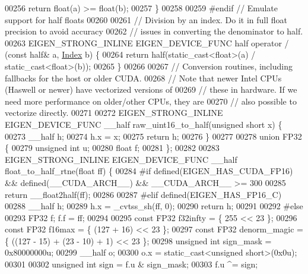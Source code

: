 \begin{DoxyCode}
00256   \textcolor{keywordflow}{return} float(a) >= float(b);
00257 \}
00258 
00259 \textcolor{preprocessor}{#endif  // Emulate support for half floats}
00260 
00261 \textcolor{comment}{// Division by an index. Do it in full float precision to avoid accuracy}
00262 \textcolor{comment}{// issues in converting the denominator to half.}
00263 EIGEN\_STRONG\_INLINE EIGEN\_DEVICE\_FUNC half operator / (\textcolor{keyword}{const} half& a, \hyperlink{namespace_eigen_a62e77e0933482dafde8fe197d9a2cfde}{Index} b) \{
00264   \textcolor{keywordflow}{return} half(static\_cast<float>(a) / static\_cast<float>(b));
00265 \}
00266 
00267 \textcolor{comment}{// Conversion routines, including fallbacks for the host or older CUDA.}
00268 \textcolor{comment}{// Note that newer Intel CPUs (Haswell or newer) have vectorized versions of}
00269 \textcolor{comment}{// these in hardware. If we need more performance on older/other CPUs, they are}
00270 \textcolor{comment}{// also possible to vectorize directly.}
00271 
00272 EIGEN\_STRONG\_INLINE EIGEN\_DEVICE\_FUNC \_\_half raw\_uint16\_to\_half(\textcolor{keywordtype}{unsigned} \textcolor{keywordtype}{short} x) \{
00273   \_\_half h;
00274   h.x = x;
00275   \textcolor{keywordflow}{return} h;
00276 \}
00277 
00278 \textcolor{keyword}{union }FP32 \{
00279   \textcolor{keywordtype}{unsigned} \textcolor{keywordtype}{int} u;
00280   \textcolor{keywordtype}{float} f;
00281 \};
00282 
00283 EIGEN\_STRONG\_INLINE EIGEN\_DEVICE\_FUNC \_\_half float\_to\_half\_rtne(\textcolor{keywordtype}{float} ff) \{
00284 \textcolor{preprocessor}{#if defined(EIGEN\_HAS\_CUDA\_FP16) && defined(\_\_CUDA\_ARCH\_\_) && \_\_CUDA\_ARCH\_\_ >= 300}
00285   \textcolor{keywordflow}{return} \_\_float2half(ff);
00286 
00287 \textcolor{preprocessor}{#elif defined(EIGEN\_HAS\_FP16\_C)}
00288   \_\_half h;
00289   h.x = \_cvtss\_sh(ff, 0);
00290   \textcolor{keywordflow}{return} h;
00291 
00292 \textcolor{preprocessor}{#else}
00293   FP32 f; f.f = ff;
00294 
00295   \textcolor{keyword}{const} FP32 f32infty = \{ 255 << 23 \};
00296   \textcolor{keyword}{const} FP32 f16max = \{ (127 + 16) << 23 \};
00297   \textcolor{keyword}{const} FP32 denorm\_magic = \{ ((127 - 15) + (23 - 10) + 1) << 23 \};
00298   \textcolor{keywordtype}{unsigned} \textcolor{keywordtype}{int} sign\_mask = 0x80000000u;
00299   \_\_half o;
00300   o.x = \textcolor{keyword}{static\_cast<}\textcolor{keywordtype}{unsigned} \textcolor{keywordtype}{short}\textcolor{keyword}{>}(0x0u);
00301 
00302   \textcolor{keywordtype}{unsigned} \textcolor{keywordtype}{int} sign = f.u & sign\_mask;
00303   f.u ^= sign;

\end{DoxyCode}
